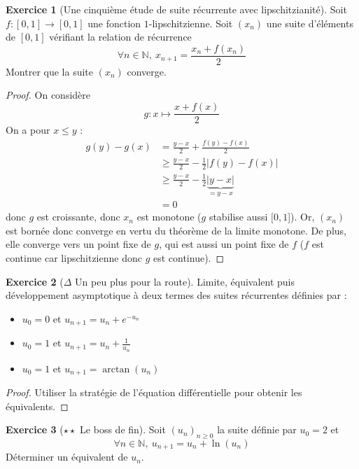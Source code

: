 \documentclass[french]{book}
\newcommand{\N}{\mathbb{N}}
\theoremstyle{definition}
\newtheorem{ex}{Exercice}[chapter]
\theoremstyle{theorem}
\theoremstyle{remark}
\begin{document}
\begin{ex}[Une cinquième étude de suite récurrente avec lipschitzianité]
	Soit $f:[0,1]\to[0,1]$ une fonction $1$-lipschitzienne. Soit $(x_n)$ une suite d'éléments de $[0,1]$ vérifiant la relation de récurrence $$\forall n\in\N,\ x_{n+1}=\frac{x_n+f(x_n)}{2}$$ Montrer que la suite $(x_n)$ converge.
\end{ex}

\begin{proof}
	On considère $$g:x\mapsto\frac{x+f(x)}{2}$$ On a pour $x\leqslant y$ : \begin{align*}
		g(y)-g(x)&=\frac{y-x}{2}+\frac{f(y)-f(x)}{2} \\
		&\geqslant \frac{y-x}{2}-\frac{1}{2}\lvert f(y)-f(x)\rvert \\
		&\geqslant\frac{y-x}{2}-\frac{1}{2}\underbrace{\lvert y-x\rvert}_{=y-x}\\
		&=0
	\end{align*} donc $g$ est croissante, donc $x_n$ est monotone ($g$ stabilise aussi $[0,1$]). Or, $(x_n)$ est bornée donc converge en vertu du théorème de la limite monotone. De plus, elle converge vers un point fixe de $g$, qui est aussi un point fixe de $f$ ($f$ est continue car lipschitzienne donc $g$ est continue).
\end{proof}

\begin{ex}[$\Delta$ Un peu plus pour la route]
	Limite, équivalent puis développement asymptotique à deux termes des suites récurrentes définies par :
	\begin{itemize}
		\item $u_0=0$ et $u_{n+1}=u_n+e^{-u_n}$
		\item $u_0=1$ et $u_{n+1}=u_n+\displaystyle\frac{1}{u_n}$
		\item $u_0=1$ et $u_{n+1}=\arctan(u_n)$
	\end{itemize}
\end{ex}

\begin{proof}
	Utiliser la stratégie de l'équation différentielle pour obtenir les équivalents.
\end{proof}

\begin{ex}[$\star\star$ Le boss de fin]
	Soit $(u_n)_{n\geqslant0}$ la suite définie par $u_0=2$ et $$\forall n\in\N,\ u_{n+1}=u_n+\ln(u_n)$$ Déterminer un équivalent de $u_n$.
\end{ex}
\end{document}
